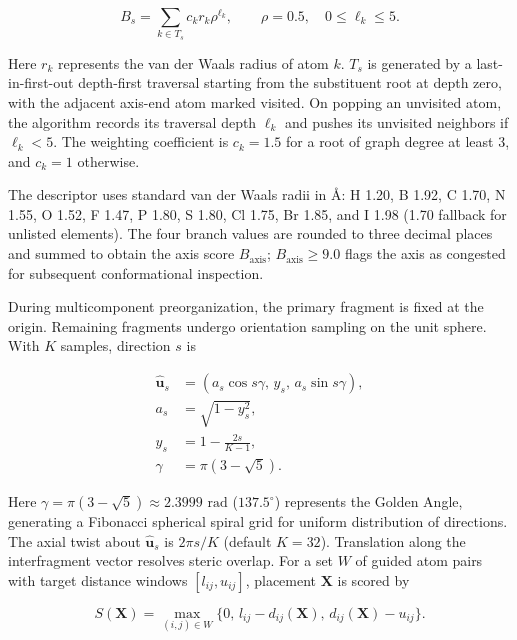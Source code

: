 \begin{equation}\label{eq:methods-04}
B_s=\sum_{k\in T_s} c_k r_k \rho^{\ell_k},\qquad\rho=0.5,\quad 0\le \ell_k\le 5.
\end{equation}

Here $r_k$ represents the van der Waals radius of atom $k$. $T_s$ is generated by a last-in-first-out depth-first traversal starting from the substituent root at depth zero, with the adjacent axis-end atom marked visited. On popping an unvisited atom, the algorithm records its traversal depth $\ell_k$ and pushes its unvisited neighbors if $\ell_k<5$. The weighting coefficient is $c_k=1.5$ for a root of graph degree at least 3, and $c_k=1$ otherwise.

The descriptor uses standard van der Waals radii in Å: H 1.20, B 1.92, C 1.70, N 1.55, O 1.52, F 1.47, P 1.80, S 1.80, Cl 1.75, Br 1.85, and I 1.98 (1.70 fallback for unlisted elements). The four branch values are rounded to three decimal places and summed to obtain the axis score $B_{\mathrm{axis}}$; $B_{\mathrm{axis}}\ge 9.0$ flags the axis as congested for subsequent conformational inspection.

During multicomponent preorganization, the primary fragment is fixed at the origin. Remaining fragments undergo orientation sampling on the unit sphere. With $K$ samples, direction $s$ is

\begin{equation}\label{eq:methods-05}
\begin{aligned}
\hat{\mathbf{u}}_s&=(a_s\cos s\gamma,\,y_s,\,a_s\sin s\gamma),\\
a_s&=\sqrt{1-y_s^2},\\
y_s&=1-\frac{2s}{K-1},\\
\gamma&=\pi(3-\sqrt{5}).
\end{aligned}
\end{equation}

Here $\gamma=\pi(3-\sqrt{5})\approx 2.3999\text{ rad}$ ($137.5^\circ$) represents the Golden Angle, generating a Fibonacci spherical spiral grid for uniform distribution of directions. The axial twist about $\hat{\mathbf{u}}_s$ is $2\pi s/K$ (default $K=32$). Translation along the interfragment vector resolves steric overlap. For a set $W$ of guided atom pairs with target distance windows $[l_{ij},u_{ij}]$, placement $\mathbf{X}$ is scored by

\begin{equation}\label{eq:methods-06}
S(\mathbf{X})=\max_{(i,j)\in W}\{0,\,l_{ij}-d_{ij}(\mathbf{X}),\,d_{ij}(\mathbf{X})-u_{ij}\}.
\end{equation}


